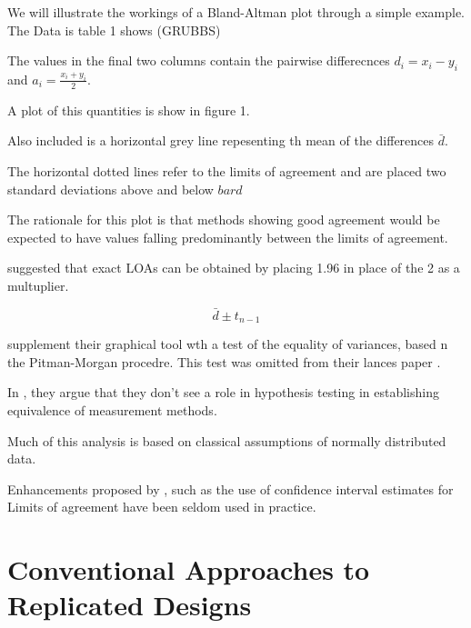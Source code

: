 \documentclass[12pt, a4paper]{report}
\theoremstyle{plain}
\theoremstyle{definition}
\theoremstyle{remark}
\begin{document}
We will illustrate the workings of a Bland-Altman plot through a simple example. The Data is table 1 shows (GRUBBS)


The values in the final two columns contain the pairwise differecnces $d_i = x_i - y_i$ and $a_i = \frac{x_i + y_i}{2} $.


A plot of this quantities is show in figure 1.

Also included is a horizontal grey line repesenting th mean of the differences $\bar{d}$.

The horizontal dotted lines refer to the limits of agreement and are placed two standard deviations above and below $bar{d}$

The rationale for this plot is that methods showing good agreement would be expected to 
have values falling predominantly between the limits of agreement.



\citet{BA86} suggested that exact LOAs can be obtained by placing 1.96 in place of the 2 as a multuplier.



\[ \bar{d} \pm t_{n-1}\]


\citet{BA83} supplement their graphical tool wth a test of the equality of variances, based n the Pitman-Morgan procedre. This test was omitted from their lances paper \citet{BA86}.



In \citet{BA99}, they argue that they don't see a role in hypothesis testing in establishing equivalence of measurement methods.

Much of this analysis is based on classical assumptions of normally distributed data.

Enhancements proposed by \citet{BA99}, such as the use of confidence interval estimates for Limits of agreement have been seldom used in practice.

\section{Conventional Approaches to Replicated Designs}
\end{document}
